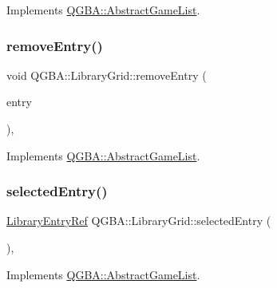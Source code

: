 Implements \mbox{\hyperlink{class_q_g_b_a_1_1_abstract_game_list_a4eb177df105d205ebc19a017343874ce}{Q\+G\+B\+A\+::\+Abstract\+Game\+List}}.

\mbox{\label{class_q_g_b_a_1_1_library_grid_a277472016829a03006aea069ffd360fa}} 
\subsubsection{\texorpdfstring{remove\+Entry()}{removeEntry()}}
{\footnotesize\ttfamily void Q\+G\+B\+A\+::\+Library\+Grid\+::remove\+Entry (\begin{DoxyParamCaption}\item[{\mbox{\hyperlink{namespace_q_g_b_a_a201fa9f2cb8f778666a134ba81909358}{Library\+Entry\+Ref}}}]{entry }\end{DoxyParamCaption})\hspace{0.3cm}{\ttfamily [override]}, {\ttfamily [virtual]}}



Implements \mbox{\hyperlink{class_q_g_b_a_1_1_abstract_game_list_ab0745ae397ca851cf29377511b10ee6f}{Q\+G\+B\+A\+::\+Abstract\+Game\+List}}.

\mbox{\label{class_q_g_b_a_1_1_library_grid_a94005ca0086b9d47e274bcf7b8bf633c}} 
\subsubsection{\texorpdfstring{selected\+Entry()}{selectedEntry()}}
{\footnotesize\ttfamily \mbox{\hyperlink{namespace_q_g_b_a_a201fa9f2cb8f778666a134ba81909358}{Library\+Entry\+Ref}} Q\+G\+B\+A\+::\+Library\+Grid\+::selected\+Entry (\begin{DoxyParamCaption}{ }\end{DoxyParamCaption})\hspace{0.3cm}{\ttfamily [override]}, {\ttfamily [virtual]}}



Implements \mbox{\hyperlink{class_q_g_b_a_1_1_abstract_game_list_ac456bb5443e0b60ff7fb6e3d64fbb338}{Q\+G\+B\+A\+::\+Abstract\+Game\+List}}.

